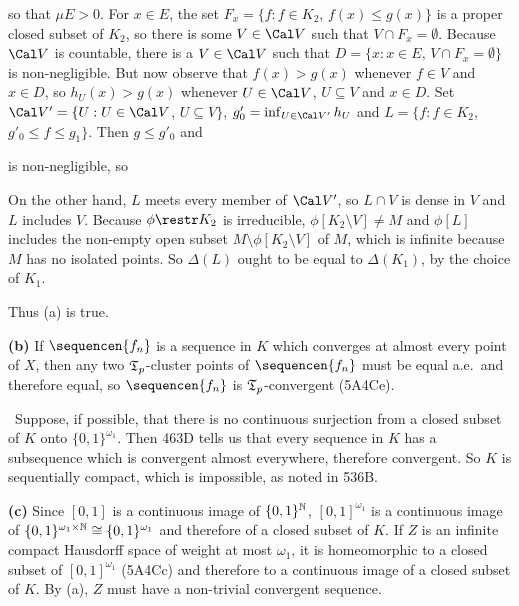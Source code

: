 {

\noindent so that
$\mu E>0$.   For $x\in E$, the set $F_x=\{f:f\in K_2,\,f(x)\le g(x)\}$
is a proper closed subset of $K_2$, so there is
some $V\in\Cal V$ such that $V\cap F_x=\emptyset$.   Because
$\Cal V$ is countable, there is a $V\in\Cal V$ such that
$D=\{x:x\in E,\,V\cap F_x=\emptyset\}$ is non-negligible.
But now observe that
$f(x)>g(x)$ whenever $f\in V$ and $x\in D$, so
$h_U(x)>g(x)$
whenever $U\in\Cal V$, $U\subseteq V$ and $x\in D$.   Set
$\Cal V'=\{U:U\in\Cal V$, $U\subseteq V\}$,
$g'_0=\inf_{U\in\Cal V'}h_U$ and
$L=\{f:f\in K_2$, $g'_0\le f\le g_1\}$.   Then $g\le g'_0$ and


\noindent is non-negligible, so


\noindent On the other hand, $L$ meets every member of $\Cal V'$,
so $L\cap V$ is dense in $V$ and $L$ includes $V$.   Because
$\phi\restr K_2$ is irreducible, $\phi[K_2\setminus V]\ne M$ and
$\phi[L]$ includes the non-empty open subset
$M\setminus\phi[K_2\setminus V]$ of $M$, which is infinite because
$M$ has no isolated points.   So $\Delta(L)$ ought to be equal to
$\Delta(K_1)$, by the choice of $K_1$.\ \Bang

Thus (a) is true.

\medskip

{\bf (b)} If $\sequencen{f_n}$ is a sequence in $K$ which converges
at almost every point of $X$, then any two $\frak T_p$-cluster points of
$\sequencen{f_n}$ must be equal a.e.\ and therefore equal, so
$\sequencen{f_n}$ is $\frak T_p$-convergent (5A4Ce).

\Quer\ Suppose, if possible, that there is no continuous
surjection from a closed subset of $K$ onto $\{0,1\}^{\omega_1}$.   Then
463D tells us that every sequence in $K$ has a subsequence
which is convergent almost everywhere, therefore convergent.
So $K$ is sequentially compact, which is impossible, as noted in 536B.\
\Bang

\medskip

{\bf (c)} Since $[0,1]$ is a continuous image of $\{0,1\}^{\Bbb N}$,
$[0,1]^{\omega_1}$ is a continuous image of
$\{0,1\}^{\omega_1\times\Bbb N}\cong\{0,1\}^{\omega_1}$ and therefore of
a closed subset of $K$.   If $Z$ is an infinite compact Hausdorff space
of weight at most $\omega_1$, it is homeomorphic to a closed subset of
$[0,1]^{\omega_1}$ (5A4Cc) and therefore to a continuous image of a
closed subset of $K$.   By (a), $Z$ must have a non-trivial convergent
sequence.

}
